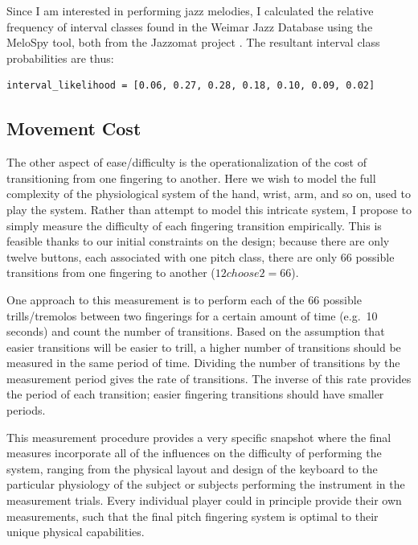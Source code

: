\documentclass[sigconf]{nimeart}
\begin{document}
Since I am interested in performing jazz melodies, I calculated the relative frequency of interval classes found in the Weimar Jazz Database using the MeloSpy tool, both from the Jazzomat project \cite{Pfleiderer2017}. The resultant interval class probabilities are thus:

\begin{Verbatim}[breaklines=true,breakanywhere=true,fontsize=\footnotesize]
interval_likelihood = [0.06, 0.27, 0.28, 0.18, 0.10, 0.09, 0.02]
\end{Verbatim}

\subsection{Movement Cost}\label{movement-cost}

The other aspect of ease/difficulty is the operationalization of the cost of transitioning from one fingering to another. Here we wish to model the full complexity of the physiological system of the hand, wrist, arm, and so on, used to play the system. Rather than attempt to model this intricate system, I propose to simply measure the difficulty of each fingering transition empirically. This is feasible thanks to our initial constraints on the design; because there are only twelve buttons, each associated with one pitch class, there are only 66 possible transitions from one fingering to another ($12choose2 = 66$).

One approach to this measurement is to perform each of the 66 possible trills/tremolos between two fingerings for a certain amount of time (e.g.~10 seconds) and count the number of transitions. Based on the assumption that easier transitions will be easier to trill, a higher number of transitions should be measured in the same period of time. Dividing the number of transitions by the measurement period gives the rate of transitions. The inverse of this rate provides the period of each transition; easier fingering transitions should have smaller periods.

This measurement procedure provides a very specific snapshot where the final measures incorporate all of the influences on the difficulty of performing the system, ranging from the physical layout and design of the keyboard to the particular physiology of the subject or subjects performing the instrument in the measurement trials. Every individual player could in principle provide their own measurements, such that the final pitch fingering system is optimal to their unique physical capabilities.
\end{document}
